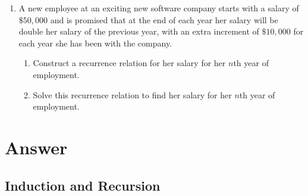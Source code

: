 \documentclass{../../cls/sig-alternate-05-2015}
\begin{document}
\begin{enumerate}
\item A new employee at an exciting new software company
starts with a salary of $\$50,000$ and is promised that at the
end of each year her salary will be double her salary of
the previous year, with an extra increment of $\$10,000$ for
each year she has been with the company.
\begin{enumerate}
	\item Construct a recurrence relation for her salary for her
	$n$th year of employment.
	\item Solve this recurrence relation to find her salary for her
	$n$th year of employment.
\end{enumerate}






\end{enumerate}

\nocite{*}

 
\clearpage
\appendix
\section{Answer}
\subsection{Induction and Recursion}
\end{document}
